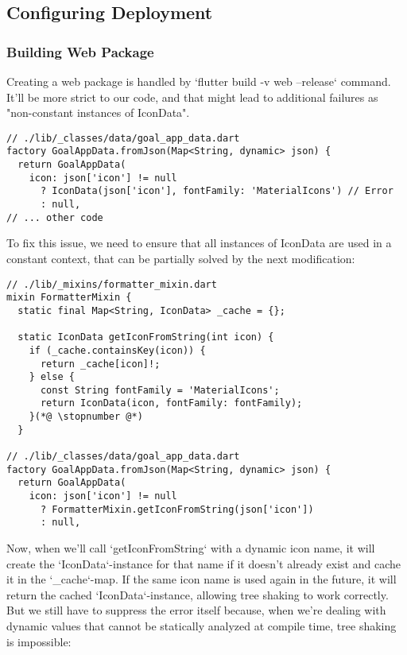 
\subsection{Configuring Deployment}


\subsubsection{Building Web Package}

Creating a web package is handled by `flutter build -v web --release` command. It'll be more strict to our code, and 
that might lead to additional failures as "non-constant instances of IconData".

\begin{lstlisting}
// ./lib/_classes/data/goal_app_data.dart
factory GoalAppData.fromJson(Map<String, dynamic> json) {
  return GoalAppData(
    icon: json['icon'] != null
      ? IconData(json['icon'], fontFamily: 'MaterialIcons') // Error
      : null,
// ... other code
\end{lstlisting}

\noindent To fix this issue, we need to ensure that all instances of IconData are used in a constant context, that can 
be partially solved by the next modification:
\begin{lstlisting}
// ./lib/_mixins/formatter_mixin.dart
mixin FormatterMixin {
  static final Map<String, IconData> _cache = {};

  static IconData getIconFromString(int icon) {
    if (_cache.containsKey(icon)) {
      return _cache[icon]!;
    } else {
      const String fontFamily = 'MaterialIcons';
      return IconData(icon, fontFamily: fontFamily);
    }(*@ \stopnumber @*)
  }

// ./lib/_classes/data/goal_app_data.dart
factory GoalAppData.fromJson(Map<String, dynamic> json) {
  return GoalAppData(
    icon: json['icon'] != null
      ? FormatterMixin.getIconFromString(json['icon'])
      : null,
\end{lstlisting}

Now, when we'll call `getIconFromString` with a dynamic icon name, it will create the `IconData`-instance for that name 
if it doesn't already exist and cache it in the `\_cache`-map. If the same icon name is used again in the future, 
it will return the cached `IconData`-instance, allowing tree shaking to work correctly. But we still have to suppress 
the error itself because, when we're dealing with dynamic values that cannot be statically analyzed at compile time, 
tree shaking is impossible:

